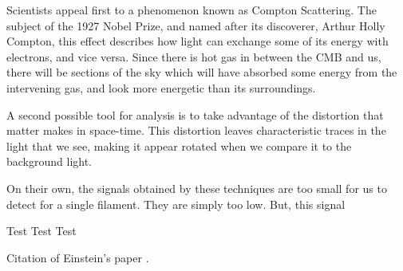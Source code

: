 \documentclass{nature}
\begin{document}
Scientists appeal first to a phenomenon known as Compton Scattering. The subject of the 1927 Nobel Prize, and named after its discoverer, Arthur Holly Compton, this effect describes how light can exchange some of its energy with electrons, and vice versa. Since there is hot gas in between the CMB and us, there will be sections of the sky which will have absorbed some energy from the intervening gas, and look more energetic than its surroundings. 

A second possible tool for analysis is to take advantage of the distortion that matter makes in space-time. This distortion leaves characteristic traces in the light that we see, making it appear rotated when we compare it to the background light. 

On their own, the signals obtained by these techniques are too small for us to detect for a single filament. They are simply too low. But, this signal 

Test Test Test

Citation of Einstein's paper \cite{Einstein}.



\end{document}
